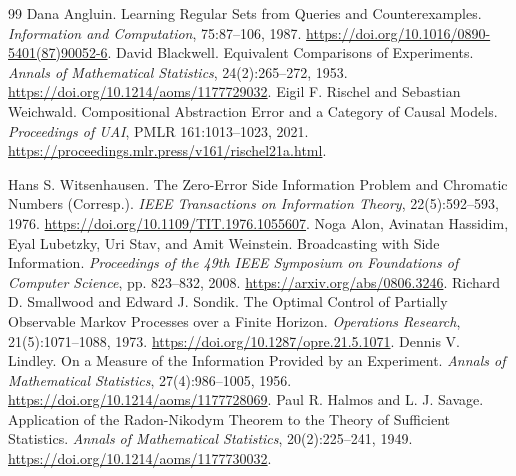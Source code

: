 \documentclass[11pt,oneside,openany]{book}
\numberwithin{equation}{section}
\begin{document}
\begin{thebibliography}{99}
 Dana Angluin. Learning Regular Sets from Queries and Counterexamples. \emph{Information and Computation}, 75:87--106, 1987. \url{https://doi.org/10.1016/0890-5401(87)90052-6}.
 David Blackwell. Equivalent Comparisons of Experiments. \emph{Annals of Mathematical Statistics}, 24(2):265--272, 1953. \url{https://doi.org/10.1214/aoms/1177729032}.
 Eigil F. Rischel and Sebastian Weichwald. Compositional Abstraction Error and a Category of Causal Models. \emph{Proceedings of UAI}, PMLR 161:1013--1023, 2021. \url{https://proceedings.mlr.press/v161/rischel21a.html}.

 Hans S. Witsenhausen. The Zero-Error Side Information Problem and Chromatic Numbers (Corresp.). \emph{IEEE Transactions on Information Theory}, 22(5):592--593, 1976. \url{https://doi.org/10.1109/TIT.1976.1055607}.
 Noga Alon, Avinatan Hassidim, Eyal Lubetzky, Uri Stav, and Amit Weinstein. Broadcasting with Side Information. \emph{Proceedings of the 49th IEEE Symposium on Foundations of Computer Science}, pp. 823--832, 2008. \url{https://arxiv.org/abs/0806.3246}.
 Richard D. Smallwood and Edward J. Sondik. The Optimal Control of Partially Observable Markov Processes over a Finite Horizon. \emph{Operations Research}, 21(5):1071--1088, 1973. \url{https://doi.org/10.1287/opre.21.5.1071}.
 Dennis V. Lindley. On a Measure of the Information Provided by an Experiment. \emph{Annals of Mathematical Statistics}, 27(4):986--1005, 1956. \url{https://doi.org/10.1214/aoms/1177728069}.
 Paul R. Halmos and L. J. Savage. Application of the Radon-Nikodym Theorem to the Theory of Sufficient Statistics. \emph{Annals of Mathematical Statistics}, 20(2):225--241, 1949. \url{https://doi.org/10.1214/aoms/1177730032}.
\end{thebibliography}
\end{document}
